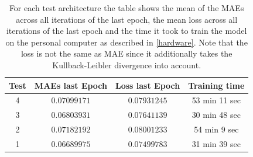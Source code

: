 \begin{center}
    \begin{table}[H]
        \centering
        \begin{tabular}{ | c | c | c | c | }
            \hline
            Test &MAEs last Epoch & Loss last Epoch & Training time\\ \hline
            4 & $0.07099171$  & $0.07931245$  & 53 min 11 sec  \\
            3 & $0.06803931$  & $0.07641139$  & 30 min 48 sec  \\
            2 & $0.07182192$  & $0.08001233$  & 54 min 9 sec  \\  
            1 & $0.06689975$  & $0.07499783$  & 31 min 39 sec  \\  
            \hline
        \end{tabular} 
        \caption{For each test architecture the table shows the mean of the MAEs across all iterations of the last
        epoch, the mean loss across all iterations of the last epoch and the time it took to train the model
        on the personal computer as described in \autoref{hardware}. Note that the loss is not the same
        as MAE since it additionally takes the Kullback-Leibler divergence into account.} \label{table_maes4}
    \end{table} 
\end{center}


